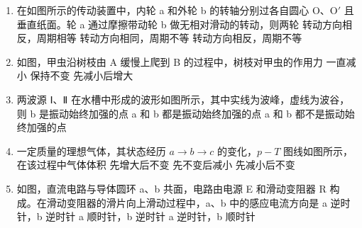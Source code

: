 \documentclass[\gkver]{gaokaozhenti}
\begin{document}
\begin{enumerate}
\item
在如图所示的传动装置中，内轮 a 和外轮 b 的转轴分别过各自圆心 O、O$'$ 且垂直纸面。轮 a 通过摩擦带动轮 b 做无相对滑动的转动，则两轮
\onepicture[w=2.60cm]{}
{转动方向相反，周期相等}
{转动方向相同，周期不等}
{转动方向相反，周期不等}

\item
如图，甲虫沿树枝由 A 缓慢上爬到 B 的过程中，树枝对甲虫的作用力
\onepicture[w=3.60cm]{}
{一直减小}
{保持不变}
{先减小后增大}

\item
两波源 Ⅰ、Ⅱ 在水槽中形成的波形如图所示，其中实线为波峰，虚线为波谷，则
\onepicture[w=5.48cm]{}
{b 是振动始终加强的点}
{a 和 b 都是振动始终加强的点}
{a 和 b 都不是振动始终加强的点}

\item
一定质量的理想气体，其状态经历 $a\to b\to c$ 的变化，$p-T$ 图线如图所示，在该过程中气体体积
\onepicture[w=2.68cm]{}
{先增大后不变}
{先不变后减小}
{先减小后不变}

\item
如图，直流电路与导体圆环 a、b 共面，电路由电源 E 和滑动变阻器 R 构成。在滑动变阻器的滑片向上滑动过程中，a、b 中的感应电流方向是
\onepicture[w=3.36cm]{}
{a 逆时针，b 逆时针}
{a 顺时针，b 逆时针}
{a 逆时针，b 顺时针}


\end{enumerate}
\end{document}
